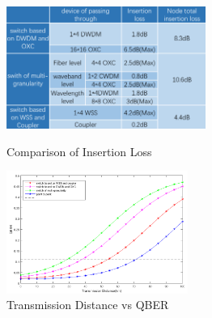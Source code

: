 \documentclass[letterpaper,10pt]{article}
\begin{document}
\begin{figure}[!htb]
   \begin{minipage}{0.48\textwidth}
     \centering
     \includegraphics[height= 4cm,width=.9\linewidth]{comparison_of_three_kind_of_nodes}
     \caption{Comparison of Insertion Loss} \label{Fig:comparison_of_loss}
   \end{minipage}\hfill
   \begin{minipage}{0.48\textwidth}
     \centering
     \includegraphics[height= 4cm,width=.9\linewidth]{transmission_distance_vs_QBER_of_three_nodes_2}
     \caption{Transmission Distance vs QBER} \label{Fig:comparison_of_rate}
   \end{minipage}
\end{figure}
\end{document}
